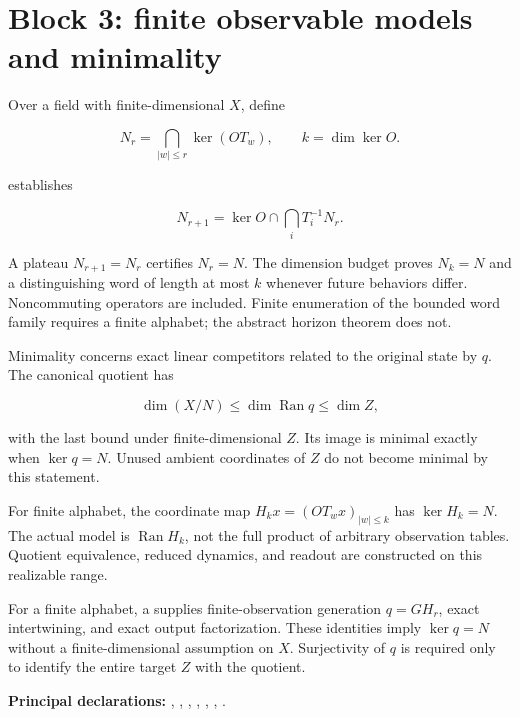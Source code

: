 \documentclass[11pt]{article}
\begin{document}
\hypertarget{block-3-finite-observable-models-and-minimality}{%
\section{Block 3: finite observable models and
minimality}\label{block-3-finite-observable-models-and-minimality}}

Over a field with finite-dimensional \(X\), define

\[
N_r=\bigcap_{|w|\le r}\ker(OT_w),\qquad k=\dim\ker O.
\]

\texttt{} establishes

\[
N_{r+1}=\ker O\cap\bigcap_iT_i^{-1}N_r.
\]

A plateau \(N_{r+1}=N_r\) certifies \(N_r=N\). The dimension budget
proves \(N_k=N\) and a distinguishing word of length at most \(k\)
whenever future behaviors differ. Noncommuting operators are included.
Finite enumeration of the bounded word family requires a finite
alphabet; the abstract horizon theorem does not.

Minimality concerns exact linear competitors related to the original
state by \(q\). The canonical quotient has

\[
\dim(X/N)\le\dim\operatorname{Ran}q\le\dim Z,
\]

with the last bound under finite-dimensional \(Z\). Its image is minimal
exactly when \(\ker q=N\). Unused ambient coordinates of \(Z\) do not
become minimal by this statement.

For finite alphabet, the coordinate map \(H_kx=(OT_wx)_{|w|\le k}\) has
\(\ker H_k=N\). The actual model is \(\operatorname{Ran}H_k\), not the
full product of arbitrary observation tables. Quotient equivalence,
reduced dynamics, and readout are constructed on this realizable range.

For a finite alphabet, a
\texttt{} supplies
finite-observation generation \(q=GH_r\), exact intertwining, and exact
output factorization. These identities imply \(\ker q=N\) without a
finite-dimensional assumption on \(X\). Surjectivity of \(q\) is
required only to identify the entire target \(Z\) with the quotient.

\textbf{Principal declarations:}
\texttt{},
\texttt{},
\texttt{},
\texttt{},
\texttt{},
\texttt{},
\texttt{}.
\end{document}
